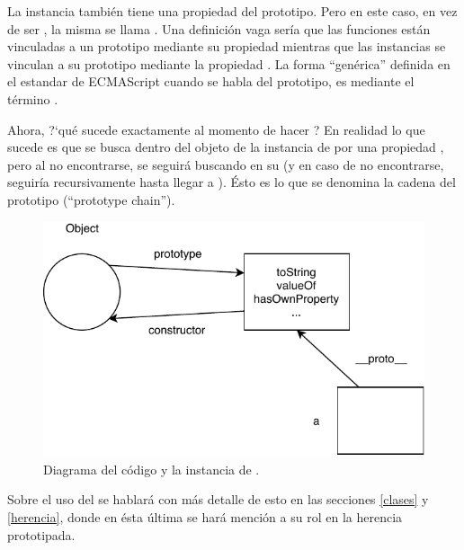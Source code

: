 La instancia  también tiene una propiedad del prototipo. Pero en este caso, en vez de ser , la misma se llama . Una definición vaga sería que las funciones están vinculadas a un prototipo mediante su propiedad  mientras que las instancias se vinculan a su prototipo mediante la propiedad . La forma "`genérica"' definida en el estandar de ECMAScript cuando se habla del prototipo, es mediante el término \code{[[Prototype]]}.

Ahora, ?`qué sucede exactamente al momento de hacer ? En realidad lo que sucede es que se busca dentro del objeto de la instancia de  por una propiedad , pero al no encontrarse, se seguirá buscando en su \code{[[Prototype]]} (y en caso de no encontrarse, seguiría recursivamente hasta llegar a ). Ésto es lo que se denomina la cadena del prototipo ("`prototype chain"').

\begin{figure}[th]
\centering
\includegraphics{Figures/Prototype2}
\decoRule
\caption[]{Diagrama del código y la instancia de .}
\label{fig:prototype}
\end{figure}

Sobre el uso del  se hablará con más detalle de esto en las secciones \ref{clases} y \ref{herencia}, donde en ésta última se hará mención a su rol en la herencia prototipada.